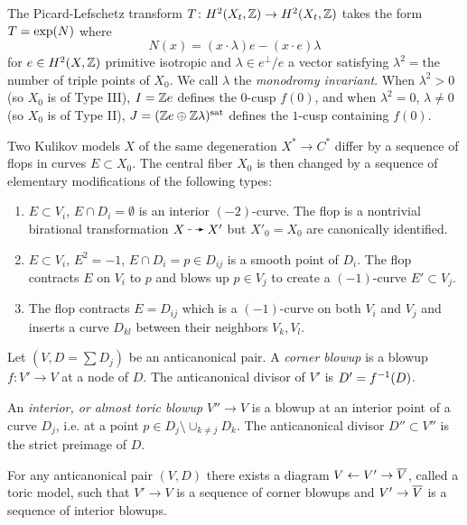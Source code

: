 \documentclass{amsart}
\begin{document}
The Picard-Lefschetz transform
$T\colon H^2(X_t,{\mathbb Z})\to H^2(X_t,{\mathbb Z})$ takes
the form $T={\rm exp}(N)$ where $$N(x) = (x\cdot \lambda)e-(x\cdot e)\lambda$$
for $e\in H^2(X,{\mathbb Z})$ primitive isotropic and $\lambda\in e^\perp/e$ a vector
satisfying $\lambda^2=\textrm{the}$ number of triple points of $X_0$. We call $\lambda$
the {\it monodromy invariant}. When $\lambda^2>0$ (so $X_0$ is of Type III),
$I={\mathbb Z} e$ defines the $0$-cusp $f(0)$, and when $\lambda^2=0$, $\lambda\neq 0$
(so $X_0$ is of Type II),
$J=({\mathbb Z} e\oplus {\mathbb Z} \lambda)^{\rm sat}$ defines the $1$-cusp containing $f(0)$.

\medskip

Two Kulikov models $X$ of the same degeneration $X^*\to C^*$
differ by a sequence of flops in curves $E\subset X_0$.
The central fiber $X_0$ is then changed by a
sequence of elementary modifications of the following types:
\begin{enumerate}
\item[(M0)] $E\subset V_i$, $E\cap D_i=\emptyset$ is an interior
  $(-2)$-curve. The flop is a nontrivial birational transformation
  $X\ratmap X'$ but $X'_0=X_0$ are canonically identified.
\item[(M1)] $E\subset V_i$, $E^2=-1$, $E\cap D_i=p\in D_{ij}$ is a
  smooth point of $D_i$. The flop contracts $E$ on $V_i$ to $p$ and
  blows up $p\in V_j$ to create a $(-1)$-curve $E'\subset V_j$.
\item[(M2)] The flop contracts $E=D_{ij}$ which is a $(-1)$-curve on
  both $V_i$ and $V_j$ and inserts a curve $D_{kl}$ between their
  neighbors $V_k,V_l$.
\end{enumerate}

\medskip

\begin{definition}
  Let $(V, D=\sum D_j)$ be an anticanonical pair.  A
  \emph{corner blowup} is a blowup $f\colon V'\to V$ at a node of $D$.
  The anticanonical divisor of $V'$ is $D'=f^{-1}(D)$. 
  
  An \emph{interior, or almost toric blowup} $V''\to V$ is a blowup at an
  interior point of a curve $D_{j}$, i.e. at a point
  $p\in D_j \setminus \cup_{k\ne j} D_k$. The anticanonical
  divisor $D''\subset V''$ is the strict preimage of $D$.
\end{definition}

\begin{lemma}
  \label{def:toric-model}
  For any anticanonical pair $(V,D)$ there exists a
  diagram $V \gets V' \to {\overline V}$, called a {\rm toric model}, such that $V'\to V$ is a
  sequence of corner blowups and $V'\to {\overline V}$ is a sequence of
  interior blowups. 
\end{lemma}
\end{document}
